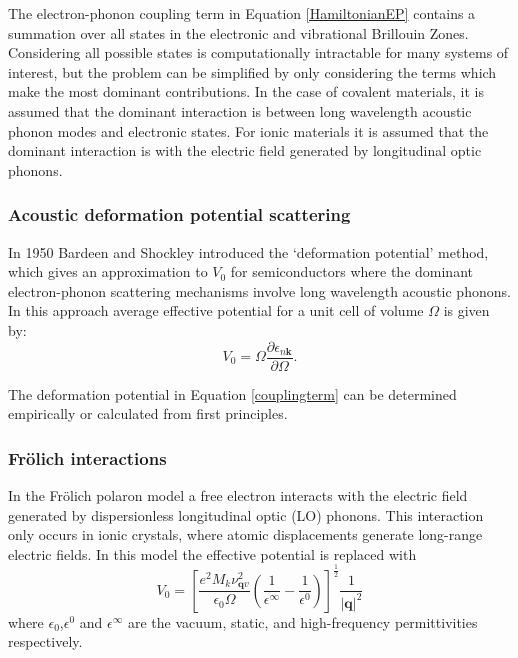 The electron-phonon coupling term in Equation \ref{HamiltonianEP} contains a summation over all states in the electronic and vibrational Brillouin Zones. Considering all possible states is computationally intractable for many systems of interest, but the problem can be simplified by only considering the terms which make the most dominant contributions. In the case of covalent materials, it is assumed that the dominant interaction is between long wavelength acoustic phonon modes and electronic states. For ionic materials it is assumed that the dominant interaction is with the electric field generated by longitudinal optic phonons.

\subsubsection{Acoustic deformation potential scattering}  
 In 1950 Bardeen and Shockley introduced the `deformation potential' method,\autocite{Bardeen1950} which gives an approximation to $V_0$ for semiconductors where the dominant electron-phonon scattering mechanisms involve long wavelength acoustic phonons.\autocite{Giustino2017} In this approach average effective potential for a unit cell of volume $\Omega$ is given by:
\begin{equation} \label{couplingterm} 
   V_0 = \Omega\frac{\partial\epsilon_{n\textbf{k}}}{\partial\Omega}.
\end{equation}

The deformation potential in Equation \ref{couplingterm} can be determined empirically or calculated from first principles. 

\subsubsection{Fr\"{o}lich interactions}  
In the Fr\"{o}lich polaron model a free electron interacts with the electric field generated by dispersionless longitudinal optic (LO) phonons.
This interaction only occurs in ionic crystals, where atomic displacements generate long-range electric fields.
In this model the effective potential is replaced with
\begin{equation}
    V_0 = \left[\frac{e^2M_k\nu^2_{\textbf{q}v}}{\epsilon_0\Omega}\left(\frac{1}{\epsilon^{\infty}}-\frac{1}{\epsilon^0}\right)\right]^{\frac{1}{2}}\frac{1}{|\textbf{q}|^2}
\end{equation}
where $\epsilon_0$,$\epsilon^0$ and $\epsilon^{\infty}$ are the vacuum, static, and high-frequency permittivities respectively.


